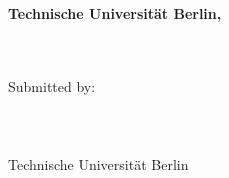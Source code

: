 {\vfill

\textbf{Technische Universit\"at Berlin, \projectYear} \\
\small{\facultyName \\
    \departmentName}
\vspace{1cm}
}

\thispagestyle{empty}
\clearpage

\vspace*{\fill}
\begin{centering}
    {\huge\textbf{\projectTitle}\par}
    \vspace{1cm}
    \large{\thesisType}\\
    \vspace{1cm}
    Submitted by:\\
    \authors\\
    \matrikel                     \\
    \authorEmail                  \\
    \vspace{1cm}
    Technische Universit\"at Berlin\\
    \facultyName \\
    \departmentName \\
    \vspace{1cm}
    \projectYear\\

\end{centering}

\vspace*{\fill}
\thispagestyle{empty}
\clearpage

